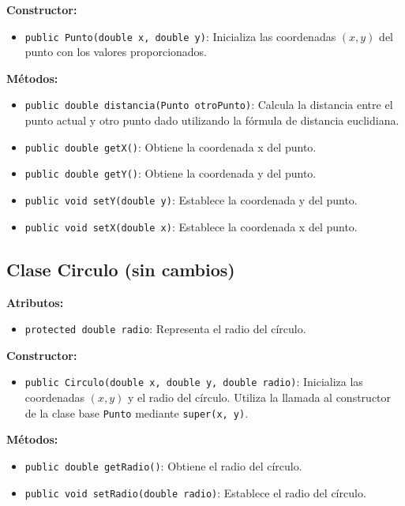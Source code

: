 \textbf{Constructor:}
\begin{itemize}
    \item \texttt{public Punto(double x, double y)}: Inicializa las coordenadas \((x, y)\) del punto con los valores proporcionados.
\end{itemize}

\textbf{Métodos:}
\begin{itemize}
    \item \texttt{public double distancia(Punto otroPunto)}: Calcula la distancia entre el punto actual y otro punto dado utilizando la fórmula de distancia euclidiana.
    \item \texttt{public double getX()}: Obtiene la coordenada x del punto.
    \item \texttt{public double getY()}: Obtiene la coordenada y del punto.
    \item \texttt{public void setY(double y)}: Establece la coordenada y del punto.
    \item \texttt{public void setX(double x)}: Establece la coordenada x del punto.
\end{itemize}

\subsection{Clase Circulo (sin cambios)}
\textbf{Atributos:}
\begin{itemize}
    \item \texttt{protected double radio}: Representa el radio del círculo.
\end{itemize}

\textbf{Constructor:}
\begin{itemize}
    \item \texttt{public Circulo(double x, double y, double radio)}: Inicializa las coordenadas \((x, y)\) y el radio del círculo. Utiliza la llamada al constructor de la clase base \texttt{Punto} mediante \texttt{super(x, y)}.
\end{itemize}

\textbf{Métodos:}
\begin{itemize}
    \item \texttt{public double getRadio()}: Obtiene el radio del círculo.
    \item \texttt{public void setRadio(double radio)}: Establece el radio del círculo.
\end{itemize}

